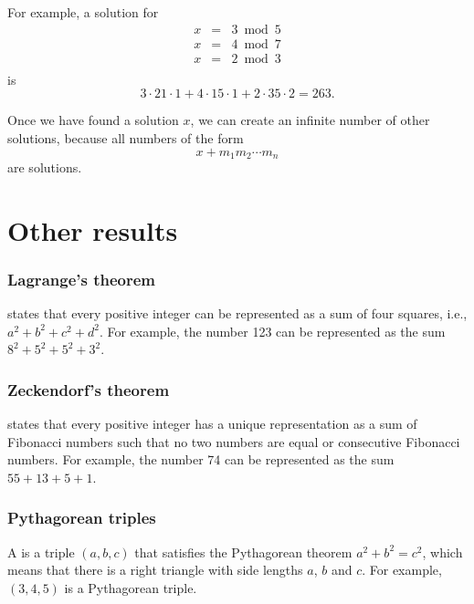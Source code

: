 For example, a solution for
\[
\begin{array}{lcl}
x & = & 3 \bmod 5 \\
x & = & 4 \bmod 7 \\
x & = & 2 \bmod 3 \\
\end{array}
\]
is
\[ 3 \cdot 21 \cdot 1 + 4 \cdot 15 \cdot 1 + 2 \cdot 35 \cdot 2 = 263.\]

Once we have found a solution $x$,
we can create an infinite number of other solutions,
because all numbers of the form
\[x+m_1 m_2 \cdots m_n\]
are solutions.

\section{Other results}

\subsubsection{Lagrange's theorem}


states that every positive integer
can be represented as a sum of four squares, i.e.,
$a^2+b^2+c^2+d^2$.
For example, the number 123 can be represented
as the sum $8^2+5^2+5^2+3^2$.

\subsubsection{Zeckendorf's theorem}


states that every
positive integer has a unique representation
as a sum of Fibonacci numbers such that
no two numbers are equal or consecutive
Fibonacci numbers.
For example, the number 74 can be represented
as the sum $55+13+5+1$.

\subsubsection{Pythagorean triples}


A  is a triple $(a,b,c)$
that satisfies the Pythagorean theorem
$a^2+b^2=c^2$, which means that there is a right triangle
with side lengths $a$, $b$ and $c$.
For example, $(3,4,5)$ is a Pythagorean triple.

